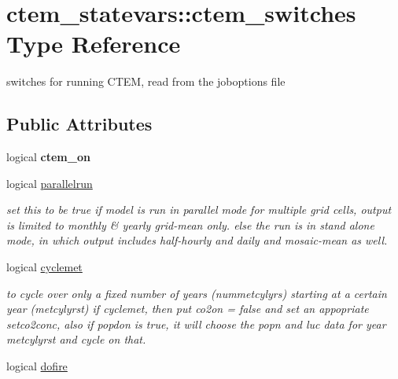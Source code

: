 \hypertarget{structctem__statevars_1_1ctem__switches}{}\section{ctem\+\_\+statevars\+:\+:ctem\+\_\+switches Type Reference}
\label{structctem__statevars_1_1ctem__switches}


switches for running C\+T\+E\+M, read from the joboptions file  


\subsection*{Public Attributes}
\begin{DoxyCompactItemize}
\item 
\hypertarget{structctem__statevars_1_1ctem__switches_a92cbf55d7a151de6b5d0fd6164812f8f}{}logical {\bfseries ctem\+\_\+on}\label{structctem__statevars_1_1ctem__switches_a92cbf55d7a151de6b5d0fd6164812f8f}

\item 
\hypertarget{structctem__statevars_1_1ctem__switches_afbae9ce730b0e1b97da241cecd3fe7a3}{}logical \hyperlink{structctem__statevars_1_1ctem__switches_afbae9ce730b0e1b97da241cecd3fe7a3}{parallelrun}\label{structctem__statevars_1_1ctem__switches_afbae9ce730b0e1b97da241cecd3fe7a3}

\begin{DoxyCompactList}\small\item\em set this to be true if model is run in parallel mode for multiple grid cells, output is limited to monthly \& yearly grid-\/mean only. else the run is in stand alone mode, in which output includes half-\/hourly and daily and mosaic-\/mean as well. \end{DoxyCompactList}\item 
\hypertarget{structctem__statevars_1_1ctem__switches_a4050812675cede871eb31ce2605868e2}{}logical \hyperlink{structctem__statevars_1_1ctem__switches_a4050812675cede871eb31ce2605868e2}{cyclemet}\label{structctem__statevars_1_1ctem__switches_a4050812675cede871eb31ce2605868e2}

\begin{DoxyCompactList}\small\item\em to cycle over only a fixed number of years (nummetcylyrs) starting at a certain year (metcylyrst) if cyclemet, then put co2on = false and set an appopriate setco2conc, also if popdon is true, it will choose the popn and luc data for year metcylyrst and cycle on that. \end{DoxyCompactList}\item 
\hypertarget{structctem__statevars_1_1ctem__switches_acd44b6d02549e9b4605b67e9d677c53a}{}logical \hyperlink{structctem__statevars_1_1ctem__switches_acd44b6d02549e9b4605b67e9d677c53a}{dofire}\label{structctem__statevars_1_1ctem__switches_acd44b6d02549e9b4605b67e9d677c53a}


\end{DoxyCompactItemize}
